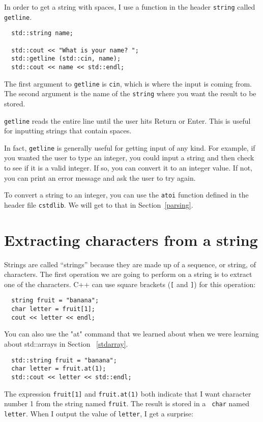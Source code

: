 In order to get a string with spaces, I use a function in the header {\tt string} called {\tt getline}.

\begin{verbatim}
  std::string name;

  std::cout << "What is your name? ";
  std::getline (std::cin, name);
  std::cout << name << std::endl;
\end{verbatim}
%
The first argument to {\tt getline} is {\tt cin}, which is
where the input is coming from.  The second argument is the
name of the {\tt string} where you want the result to be
stored.

{\tt getline} reads the entire line until the user hits
Return or Enter.  This is useful for inputting strings that
contain spaces.

In fact, {\tt getline} is generally useful for getting input
of any kind.  For example, if you wanted the user to type an
integer, you could input a string and then check to see if
it is a valid integer.  If so, you can convert it to an integer
value.  If not, you can print an error message and ask the user
to try again.

To convert a string to an integer, you can use the {\tt atoi}
function defined in the header file {\tt cstdlib}.  We will
get to that in Section~\ref{parsing}.

\section{Extracting characters from a string}

Strings are called ``strings'' because they are made up of a sequence,
or string, of characters.  The first operation we are going to
perform on a string is to extract one of the characters.  C++
can use square brackets ({\tt [} and {\tt ]}) for this operation:

\begin{verbatim}
  string fruit = "banana";
  char letter = fruit[1];
  cout << letter << endl;
\end{verbatim}
%
You can also use the "at" command that we learned about when we were 
learning about std::arrays in Section ~\ref{stdarray}.
\begin{verbatim}
  std::string fruit = "banana";
  char letter = fruit.at(1);
  std::cout << letter << std::endl;
\end{verbatim}
The expression {\tt fruit[1]} and {\tt fruit.at(1)} both indicate that I want character number 1
from the string named {\tt fruit}.  The result is stored in a {\tt
char} named {\tt letter}.  When I output the value of {\tt letter}, I
get a surprise:

